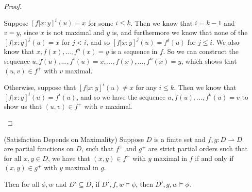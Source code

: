 \begin{proof}
\begin{enumerate}
\begin{itemize}
Suppose $[f|x:y]^i(u) = x$ for some $i \leq k$. Then we know that $i =
k-1$ and $v = y$, since $x$ is not maximal and $y$ is, and furthermore
we know that none of the $[f|x:y]^j(u) = x$ for $j < i$, and so
$[f|x:y]^j(u) = f^j(u)$ for $j \leq i$. We also know that $x, f(x),
\ldots, f^n(x) = y$ is a sequence in $f$. So we can construct the
sequence $u, f(u), \ldots, f^i(u) = x, \ldots, f(x), \ldots, f^n(x) =
y$, which shows that $(u,v) \in f^+$ with $v$ maximal.

Otherwise, suppose that $[f|x:y]^i(u) \not= x$ for any $i \leq
k$. Then we know that $[f|x:y]^i(u) = f^i(u)$, and so we have the
sequence $u, f(u), \ldots, f^k(u) = v$ to show us that $(u,v) \in f^+$ with
$v$ maximal.
\end{itemize}
\end{enumerate}
\end{proof}

\begin{lemma}{(Satisfaction Depends on Maximality)}
Suppose $D$ is a finite set and $f,g : D \rightharpoonup D$ are
partial functions on $D$, such that $f^+$ and $g^+$ are strict partial
orders such that for all $x,y \in D$, we have that $(x,y) \in f^+$
with $y$ maximal in $f$ if and only if $(x,y) \in g^+$ with $y$
maximal in $g$.

Then for all $\phi, w$ and $D' \subseteq D$, if $D', f, w \models \phi$,
then $D', g, w \models \phi$. 
\end{lemma}

% 


